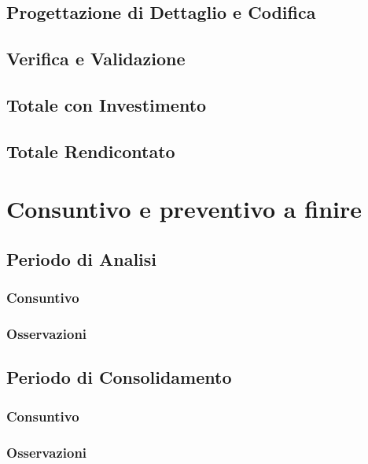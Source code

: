 \documentclass[a4paper, oneside, openany, dvipsnames, table]{article}
\begin{document}
	\subsection{Progettazione di Dettaglio e Codifica}
	    
	\newpage
	\subsection{Verifica e Validazione}
	    
	\newpage
	\subsection{Totale con Investimento}
	    
	\newpage
	\subsection{Totale Rendicontato}
	    	
\newpage
\section{Consuntivo e preventivo a finire}
	
	\subsection{Periodo di Analisi}
		
		\subsubsection{Consuntivo}
			
		\subsubsection{Osservazioni}
			
	\subsection{Periodo di Consolidamento}
			
		\subsubsection{Consuntivo}
			
		\subsubsection{Osservazioni}
			
	\newpage
\end{document}
